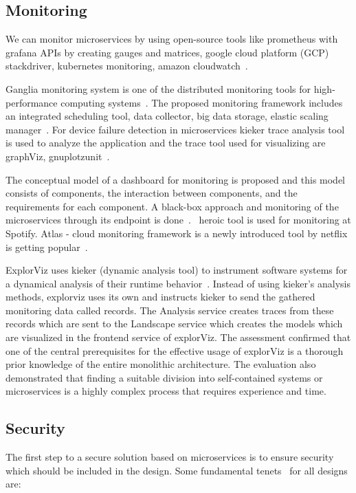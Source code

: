 \subsection{Monitoring}%
We can monitor microservices by using open-source tools like prometheus with grafana APIs by creating gauges and matrices, google cloud platform (GCP) stackdriver, kubernetes monitoring, amazon cloudwatch~\cite{Kalske2017paper, Zhang2019, Monterio2018, Venugopal2017}.

\par Ganglia monitoring system is one of the distributed monitoring tools for high-performance computing systems~\cite{Kristiani2020}. The proposed monitoring framework includes an integrated scheduling tool, data collector, big data storage, elastic scaling manager~\cite{Zhihui2020}. For device failure detection in microservices kieker trace analysis tool is used to analyze the application and the trace tool used for visualizing are graphViz, gnuplotzunit~\cite{Saman2017}.

\par The conceptual model of a dashboard for monitoring is proposed and this model consists of components, the interaction between components, and the requirements for each component. 
A black-box approach and monitoring of the microservices through its endpoint is done~\cite{Utomo2020}.~\cite{Kevin2015} heroic tool is used for monitoring at Spotify. Atlas - cloud monitoring framework is a newly introduced tool by netflix is getting popular~\cite{Netflix}. 

\par ExplorViz uses kieker (dynamic analysis tool) to instrument software systems for a dynamical analysis of their runtime behavior~\cite{Lenga2019}. Instead of using kieker’s analysis methods, explorviz uses its own and instructs kieker to send the gathered monitoring data called records. The Analysis service creates traces from these records which are sent to the Landscape service which creates the models which are visualized in the frontend service of explorViz. The assessment confirmed that one of the central prerequisites for the effective usage of explorViz is a thorough prior knowledge of the entire monolithic architecture. The evaluation also demonstrated that finding a suitable division into self-contained systems or microservices is a highly complex process that requires experience and time.


\subsection{Security}%
The first step to a secure solution based on microservices is to ensure security which should be included in the design. Some fundamental tenets~\cite{Olaf2016} for all designs are: 

